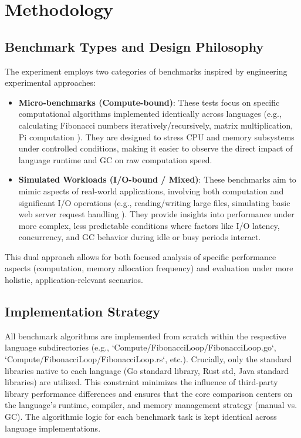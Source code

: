 \documentclass{article}
\begin{document}

\section{Methodology}

\subsection{Benchmark Types and Design Philosophy}

The experiment employs two categories of benchmarks inspired by engineering experimental approaches:

\begin{itemize}
    \item \textbf{Micro-benchmarks (Compute-bound)}: These tests focus on specific computational algorithms implemented identically across languages (e.g., calculating Fibonacci numbers iteratively/recursively, matrix multiplication, Pi computation ). They are designed to stress CPU and memory subsystems under controlled conditions, making it easier to observe the direct impact of language runtime and GC on raw computation speed.
    \item \textbf{Simulated Workloads (I/O-bound / Mixed)}: These benchmarks aim to mimic aspects of real-world applications, involving both computation and significant I/O operations (e.g., reading/writing large files, simulating basic web server request handling ). They provide insights into performance under more complex, less predictable conditions where factors like I/O latency, concurrency, and GC behavior during idle or busy periods interact.
\end{itemize}
This dual approach allows for both focused analysis of specific performance aspects (computation, memory allocation frequency) and evaluation under more holistic, application-relevant scenarios.

\subsection{Implementation Strategy}

All benchmark algorithms are implemented from scratch within the respective language subdirectories (e.g., `Compute/FibonacciLoop/FibonacciLoop.go`, `Compute/FibonacciLoop/FibonacciLoop.rs`, etc.). Crucially, only the standard libraries native to each language (Go standard library, Rust std, Java standard libraries) are utilized. This constraint minimizes the influence of third-party library performance differences and ensures that the core comparison centers on the language's runtime, compiler, and memory management strategy (manual vs. GC). The algorithmic logic for each benchmark task is kept identical across language implementations.
\end{document}
